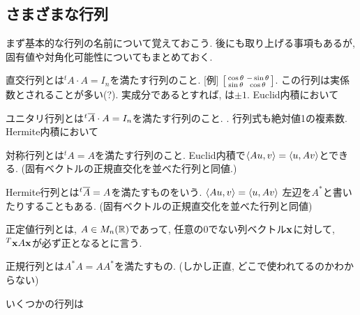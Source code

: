 \subsection{さまざまな行列}
まず基本的な行列の名前について覚えておこう. 後にも取り上げる事項もあるが, 固有値や対角化可能性についてもまとめておく.
\ben
\item 直交行列とは${}^{t}A\cdot A = I_n$を満たす行列のこと. [例]  $\left[\begin{smallmatrix}\cos{\theta} & -\sin{\theta} \\ \sin{\theta} & \cos{\theta}\end{smallmatrix}\right]$. この行列は実係数とされることが多い(?).  実成分であるとすれば, は$\pm 1$.  Euclid内積において
\item ユニタリ行列とは${}^{t}\overline{A} \cdot A = I_n$を満たす行列のこと. . 行列式も絶対値1の複素数.  Hermite内積において
\item 対称行列とは${}^{t}A = A$を満たす行列のこと. Euclid内積で$\langle Au, v \rangle = \langle u, Av \rangle$とできる. (固有ベクトルの正規直交化を並べた行列と同値.)
\item Hermite行列とは${}^{t}\overline{A} = A$を満たすものをいう. $\langle Au, v \rangle = \langle u, Av \rangle$ 左辺を$A^{\ast}$と書いたりすることもある. (固有ベクトルの正規直交化を並べた行列と同値)
\item 正定値行列とは, $A\in M_n(\mathbb{R})$であって, 任意の$0$でない列ベクトル${\bf x}$に対して, ${}^{T}{\bf x}A{\bf x}$が必ず正となるとに言う.
\item 正規行列とは$A^{\ast}A = AA^{\ast}$を満たすもの. (しかし正直, どこで使われてるのかわからない)
\item
\een

\begin{rem}
いくつかの行列は
\end{rem}

